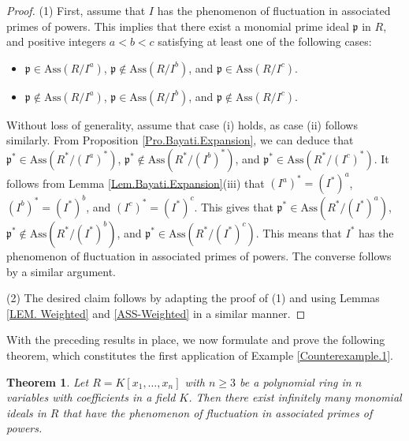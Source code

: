 \documentclass[11pt]{amsart}
\newtheorem{theorem}{Theorem}[section]
\begin{document}
\begin{proof}
 (1)     First, assume that $I$ has the  phenomenon  of  fluctuation in associated primes of powers.  This implies that
    there exist  a monomial prime ideal $\mathfrak{p}$ in $R$, and  positive integers $a<b<c$ satisfying  at least one of the following cases:
\begin{itemize}
\item[(i)] $\mathfrak{p} \in \mathrm{Ass}(R/I^a)$, $\mathfrak{p} \notin \mathrm{Ass}(R/I^b)$, and $\mathfrak{p} \in \mathrm{Ass}(R/I^c)$. 
\item[(ii)] $\mathfrak{p} \notin \mathrm{Ass}(R/I^a)$, $\mathfrak{p} \in \mathrm{Ass}(R/I^b)$, and $\mathfrak{p} \notin \mathrm{Ass}(R/I^c)$.
\end{itemize}
Without loss of generality, assume that case (i) holds, as case (ii) follows similarly. From  Proposition \ref{Pro.Bayati.Expansion}, we can 
deduce that  
    $\mathfrak{p}^* \in \mathrm{Ass}(R^*/(I^a)^*)$, $\mathfrak{p}^* \notin \mathrm{Ass}(R^*/(I^b)^*)$, 
    and $\mathfrak{p}^* \in \mathrm{Ass}(R^*/(I^c)^*)$.   It follows from Lemma \ref{Lem.Bayati.Expansion}(iii) that 
$(I^{a})^*=(I^*)^{a}$, $(I^{b})^*=(I^*)^{b}$, and $(I^{c})^*=(I^*)^{c}$.  This gives that 
$\mathfrak{p}^* \in \mathrm{Ass}(R^*/(I^*)^a)$, $\mathfrak{p}^* \notin \mathrm{Ass}(R^*/(I^*)^b)$, 
    and $\mathfrak{p}^* \in \mathrm{Ass}(R^*/(I^*)^c)$. This means that  $I^*$  has the  phenomenon  of  fluctuation in associated primes of powers. 
The converse follows by a similar argument.
    
   
  (2)     The desired claim  follows by adapting the proof of (1) and using Lemmas \ref{LEM. Weighted} and \ref{ASS-Weighted} in a similar manner.
 \end{proof}


 With the preceding results in place, we now formulate and prove the following theorem, which constitutes the first application of 
 Example \ref{Counterexample.1}.

\begin{theorem} \label{Th.Fluctuation}
Let $R=K[x_1, \ldots, x_n]$ with $n\geq 3$ be  a polynomial ring in $n$  variables  with coefficients in a  field $K$. 
Then there exist infinitely many  monomial ideals  in $R$  that  have  the  phenomenon  of  fluctuation in  associated primes of powers.
\end{theorem}
\end{document}
